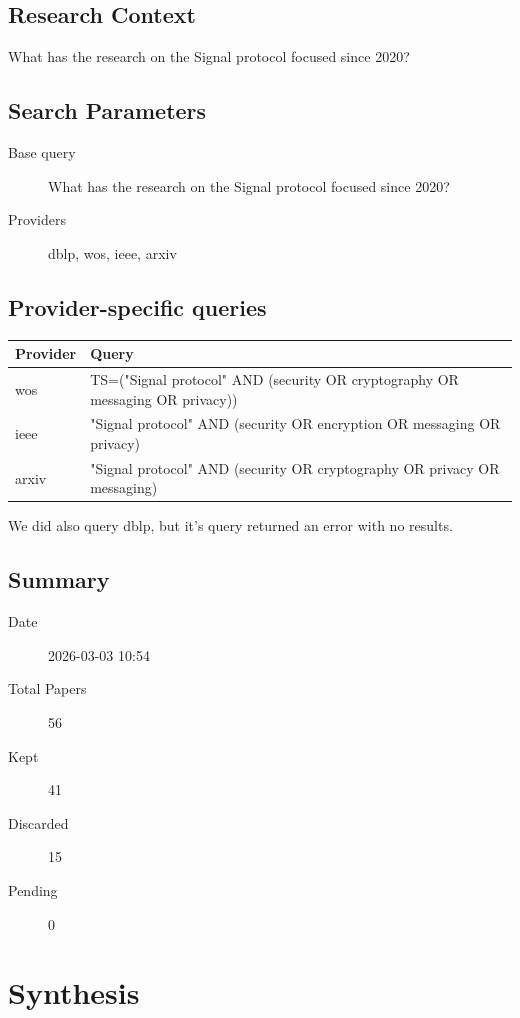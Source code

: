 \subsection{Research Context}
What has the research on the Signal protocol focused since 2020?

\subsection{Search Parameters}

\begin{description}
\item[Base query] What has the research on the Signal protocol focused since 2020?
\item[Providers] dblp, wos, ieee, arxiv
\end{description}

\subsection{Provider-specific queries}
\begin{longtable}{lp{10cm}}
\toprule
Provider & Query \\
\midrule
wos & TS=("Signal protocol" AND (security OR cryptography OR messaging OR 
privacy)) \\
ieee & "Signal protocol" AND (security OR encryption OR messaging OR privacy) \\
arxiv & "Signal protocol" AND (security OR cryptography OR privacy OR messaging) \\
\bottomrule
\end{longtable}

We did also query dblp, but it's query returned an error with no results.

\subsection{Summary}

\begin{description}
\item[Date] 2026-03-03 10:54
\item[Total Papers] 56
\item[Kept] 41
\item[Discarded] 15
\item[Pending] 0
\end{description}


\section{Synthesis}

